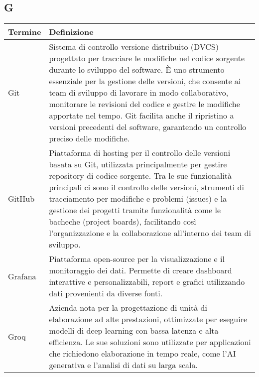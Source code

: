 \documentclass[10pt]{article}
\begin{document}
\subsection{G} %
\begin{longtable}{|>{\centering\arraybackslash}m{2.5cm}|>{\arraybackslash}m{12.5cm}|}
\hline
\rowcolor[gray]{0.8}
\textbf{Termine} & \textbf{Definizione}\\
\endhead
\hline
Git & Sistema di controllo versione distribuito (DVCS) progettato per tracciare le modifiche nel codice sorgente durante lo sviluppo del software. È uno strumento essenziale per la gestione delle versioni, che consente ai team di sviluppo di lavorare in modo collaborativo, monitorare le revisioni del codice e gestire le modifiche apportate nel tempo. Git facilita anche il ripristino a versioni precedenti del software, garantendo un controllo preciso delle modifiche.\\
\hline
GitHub & Piattaforma di hosting per il controllo delle versioni basata su Git, utilizzata principalmente per gestire repository di codice sorgente. Tra le sue funzionalità principali ci sono il controllo delle versioni, strumenti di tracciamento per modifiche e problemi (issues) e la gestione dei progetti tramite funzionalità come le bacheche (project boards), facilitando così l'organizzazione e la collaborazione all'interno dei team di sviluppo.\\
\hline
Grafana & Piattaforma open-source per la visualizzazione e il monitoraggio dei dati. Permette di creare dashboard interattive e personalizzabili, report e grafici utilizzando dati provenienti da diverse fonti.\\
\hline
Groq & Azienda nota per la progettazione di unità di elaborazione ad alte prestazioni, ottimizzate per eseguire modelli di deep learning con bassa latenza e alta efficienza. Le sue soluzioni sono utilizzate per applicazioni che richiedono elaborazione in tempo reale, come l'AI generativa e l'analisi di dati su larga scala.\\
\hline
\end{longtable}

\end{document}
